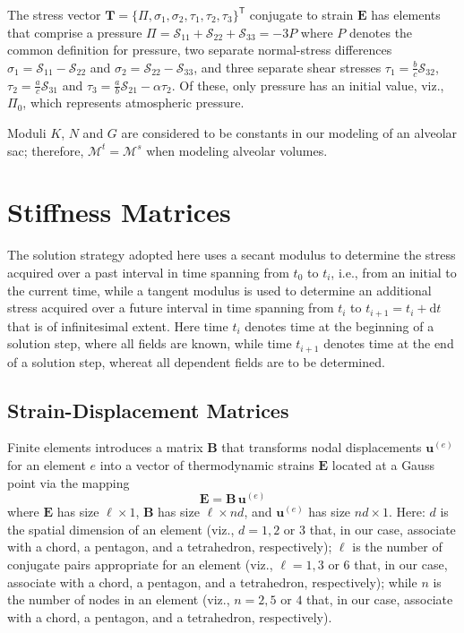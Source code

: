 The stress vector $\boldsymbol{T} = \{ \Pi, \sigma_1, \sigma_2, \tau_1, \tau_2, \tau_3 \}^{\mathsf{T}}$ conjugate to strain $\boldsymbol{E}$ has elements that comprise a pressure $\Pi = \mathcal{S}_{11} + \mathcal{S}_{22} + \mathcal{S}_{33} = -3P$ where $P$ denotes the common definition for pressure, two separate normal-stress differences $\sigma_1 = \mathcal{S}_{11} - \mathcal{S}_{22}$ and $\sigma_2 = \mathcal{S}_{22} - \mathcal{S}_{33}$, and three separate shear stresses $\tau_1 = \frac{b}{c} \mathcal{S}_{32}$, $\tau_2 = \frac{a}{c} \mathcal{S}_{31}$ and $\tau_3 = \frac{a}{b} \mathcal{S}_{21} - \alpha \tau_2$.  Of these, only pressure has an initial value, viz., $\Pi_0$, which represents atmospheric pressure.

Moduli $K$, $N$ and $G$ are considered to be constants in our modeling of an alveolar sac; therefore, $\boldsymbol{\mathcal{M}}^t = \boldsymbol{\mathcal{M}}^s$ when modeling alveolar volumes.

\section{Stiffness Matrices}

The solution strategy adopted here uses a secant modulus to determine the stress acquired over a past interval in time spanning from $t_0$ to $t_i$, i.e., from an initial to the current time, while a tangent modulus is used to determine an additional stress acquired over a future interval in time spanning from $t_i$ to $t_{i+1} = t_i + \mathrm{d}t$ that is of infinitesimal extent.  Here time $t_i$ denotes time at the beginning of a solution step, where all fields are known, while time $t_{i+1}$ denotes time at the end of a solution step, whereat all dependent fields are to be determined.


\subsection{Strain-Displacement Matrices}

Finite elements introduces a matrix $\mathbf{B}$ that transforms nodal displacements $\boldsymbol{u}^{(e)}$ for an element $e$ into a vector of thermo\-dynamic strains $\boldsymbol{E}$ located at a Gauss point via the mapping
\begin{equation}
\boldsymbol{E} = \mathbf{B} \, \boldsymbol{u}^{(e)}
\label{strain} 
\end{equation}
where $\boldsymbol{E}$ has size $\ell \! \times \! 1$, $\mathbf{B}$ has size $\ell \! \times \! nd$, and $\boldsymbol{u}^{(e)}$ has size $nd \! \times \! 1$.  Here: $d$ is the spatial dimension of an element (viz., $d = 1, 2$ or $3$ that, in our case, associate with a chord, a pentagon, and a tetrahedron, respectively); $\ell$ is the number of conjugate pairs appropriate for an element (viz., $\ell = 1, 3$ or $6$ that, in our case, associate with a chord, a pentagon, and a tetrahedron, respectively); while $n$ is the number of nodes in an element (viz., $n=2, 5$ or $4$ that, in our case, associate with a chord, a pentagon, and a tetrahedron, respectively).


